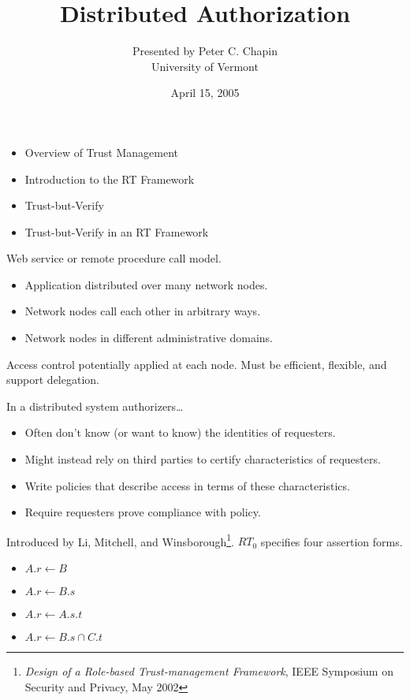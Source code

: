 \documentclass[landscape]{slides}
\begin{document}
\title{Distributed Authorization}
\author{Presented by Peter C. Chapin\\University of Vermont}
\date{April 15, 2005}
\maketitle



\begin{itemize}

\item Overview of Trust Management

\item Introduction to the RT Framework

\item Trust-but-Verify

\item Trust-but-Verify in an RT Framework

\end{itemize}

\stopslide

Web service or remote procedure call model.
\begin{itemize}
\item Application distributed over many network nodes.
\item Network nodes call each other in arbitrary ways.
\item Network nodes in different administrative domains.
\end{itemize}
Access control potentially applied at each node. Must be efficient, flexible, and support delegation.
\stopslide

In a distributed system authorizers\ldots
\begin{itemize}
\item Often don't know (or want to know) the identities of requesters.
\item Might instead rely on third parties to certify characteristics of requesters.
\item Write policies that describe access in terms of these characteristics.
\item Require requesters prove compliance with policy.
\end{itemize}
\stopslide

Introduced by Li, Mitchell, and Winsborough\footnote{\textit{Design of a Role-based Trust-management Framework}, IEEE Symposium on Security and Privacy, May 2002}. $RT_0$ specifies four assertion forms.
\begin{itemize}
\item $A.r \leftarrow B$
\item $A.r \leftarrow B.s$
\item $A.r \leftarrow A.s.t$
\item $A.r \leftarrow B.s \cap C.t$
\end{itemize}
\stopslide
\end{document}
